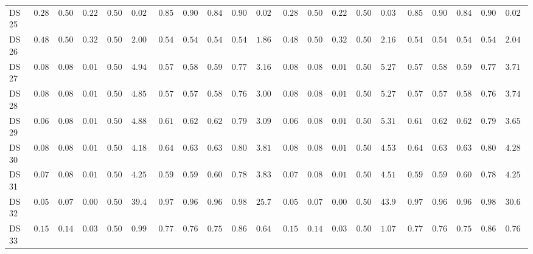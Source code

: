 {\begin{longtable}{|l|ccccc|ccccc|ccccc|ccccc|}
		DS 25 & $0.2857$ & $0.5000$ & $0.2222$ & $0.5000$ & $0.0299$ & $0.8571$ & $0.9000$ & $0.8444$ & $0.9000$ & $\boldsymbol{0.0218}$ & $0.2857$ & $0.5000$ & $0.2222$ & $0.5000$ & $0.0307$ & $\boldsymbol{0.8571}$ & $\boldsymbol{0.9000}$ & $\boldsymbol{0.8444}$ & $\boldsymbol{0.9000}$ & $0.0219$ \\
		DS 26 & $0.4800$ & $0.5000$ & $0.3243$ & $0.5000$ & $2.0023$ & $0.5440$ & $0.5455$ & $0.5439$ & $0.5455$ & $\boldsymbol{1.8609}$ & $0.4800$ & $0.5000$ & $0.3243$ & $0.5000$ & $2.1681$ & $0.5440$ & $0.5455$ & $0.5439$ & $0.5455$ & $2.0405$ \\
		DS 27 & $0.0872$ & $0.0833$ & $0.0134$ & $0.5000$ & $4.9445$ & $0.5744$ & $0.5834$ & $0.5920$ & $0.7728$ & $\boldsymbol{3.1609}$ & $0.0872$ & $0.0833$ & $0.0134$ & $0.5000$ & $5.2753$ & $0.5744$ & $0.5834$ & $0.5920$ & $0.7728$ & $3.7175$ \\
		DS 28 & $0.0872$ & $0.0833$ & $0.0134$ & $0.5000$ & $4.8540$ & $0.5795$ & $0.5779$ & $0.5872$ & $0.7698$ & $\boldsymbol{3.0097}$ & $0.0872$ & $0.0833$ & $0.0134$ & $0.5000$ & $5.2751$ & $0.5795$ & $0.5779$ & $0.5872$ & $0.7698$ & $3.7443$ \\
		DS 29 & $0.0667$ & $0.0833$ & $0.0104$ & $0.5000$ & $4.8849$ & $0.6154$ & $0.6216$ & $0.6272$ & $0.7936$ & $\boldsymbol{3.0939}$ & $0.0667$ & $0.0833$ & $0.0104$ & $0.5000$ & $5.3147$ & $0.6154$ & $0.6216$ & $0.6272$ & $0.7936$ & $3.6543$ \\
		DS 30 & $0.0884$ & $0.0833$ & $0.0135$ & $0.5000$ & $4.1849$ & $0.6409$ & $0.6343$ & $0.6326$ & $0.8005$ & $\boldsymbol{3.8196}$ & $0.0884$ & $0.0833$ & $0.0135$ & $0.5000$ & $4.5378$ & $0.6409$ & $0.6343$ & $0.6326$ & $0.8005$ & $4.2870$ \\
		DS 31 & $0.0773$ & $0.0833$ & $0.0120$ & $0.5000$ & $4.2547$ & $0.5967$ & $0.5996$ & $0.6064$ & $0.7816$ & $\boldsymbol{3.8352}$ & $0.0773$ & $0.0833$ & $0.0120$ & $0.5000$ & $4.5194$ & $0.5967$ & $0.5996$ & $0.6064$ & $0.7816$ & $4.2578$ \\
		DS 32 & $0.0515$ & $0.0714$ & $0.0070$ & $0.5000$ & $39.4753$ & $0.9751$ & $0.9699$ & $0.9683$ & $0.9838$ & $\boldsymbol{25.7418}$ & $0.0515$ & $0.0714$ & $0.0070$ & $0.5000$ & $43.9785$ & $0.9751$ & $0.9699$ & $0.9683$ & $0.9838$ & $30.6540$ \\
		DS 33 & $0.1591$ & $0.1429$ & $0.0392$ & $0.5000$ & $0.9988$ & $0.7727$ & $0.7631$ & $0.7563$ & $0.8618$ & $\boldsymbol{0.6450}$ & $0.1591$ & $0.1429$ & $0.0392$ & $0.5000$ & $1.0765$ & $0.7727$ & $0.7631$ & $0.7563$ & $0.8618$ & $0.7692$ \\

\end{longtable}}

